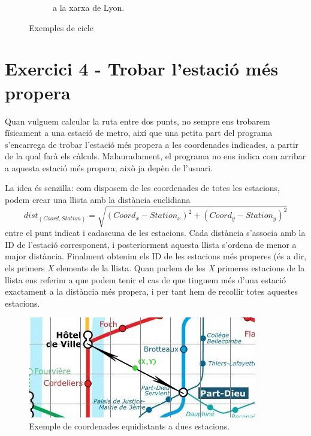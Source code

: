 \documentclass[a4paper,12pt,hidelinks]{article}
\begin{document}
\begin{figure}[h]
\begin{subfigure}[b]{0.3\textwidth}
                    \caption{a la xarxa de Lyon.}
                \end{subfigure}
                \caption{Exemples de cicle}
            \end{figure}

        \section{Exercici 4 - Trobar l’estació més propera}
        \label{sec:Exercici4}

            Quan vulguem calcular la ruta entre dos punts, no sempre ens trobarem físicament a una estació de metro, així que una petita part del programa s’encarrega de trobar l’estació més propera a les coordenades indicades, a partir de la qual farà els càlculs. Malauradament, el programa no ens indica com arribar a aquesta estació més propera; això ja depèn de l’usuari.

            La idea és senzilla: com disposem de les coordenades de totes les estacions, podem crear una llista amb la distància euclidiana
            \begin{equation*} \label{eq:coord2station}
                dist_{(Coord,Station)} = \sqrt{(Coord_x - Station_x)^2 + (Coord_y - Station_y)^2}
            \end{equation*}
            entre el punt indicat i cadascuna de les estacions. Cada distància s’associa amb la ID de l’estació corresponent, i posteriorment aquesta llista s’ordena de menor a major distància. Finalment obtenim els ID de les estacions més properes (és a dir, els primers \textit{X} elements de la llista.
            Quan parlem de les \textit{X} primeres estacions de la llista ens referim a que podem tenir el cas de que tinguem més d’una estació exactament a la distància més propera, i per tant hem de recollir totes aquestes estacions.
            \begin{figure}[h]
                \centering    
                \includegraphics{distancias.png}
                \caption{Exemple de coordenades equidistants a dues estacions.}
            \end{figure}
\end{document}
